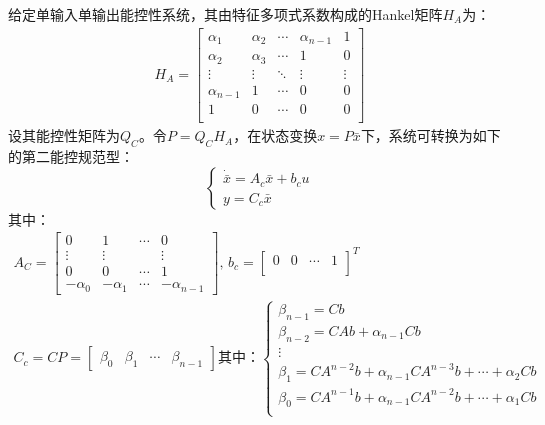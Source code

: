 \begin{theorem}[第二能控性规范型]
    给定单输入单输出能控性系统，其由特征多项式系数构成的Hankel矩阵$H_A$为：
    \begin{gather*}
        H_A = \begin{bmatrix}
            \alpha_1     & \alpha_2 & \cdots & \alpha_{n-1}  & 1       \\
            \alpha_2     & \alpha_3 & \cdots & 1             & 0       \\
            \vdots       & \vdots   & \ddots & \vdots        & \vdots  \\
            \alpha_{n-1} & 1        & \cdots & 0             & 0       \\
            1            & 0        & \cdots & 0             & 0       \\
        \end{bmatrix}
    \end{gather*}
    设其能控性矩阵为$Q_C$。令$P = Q_C H_A$，在状态变换$x = P \bar{x}$下，系统可转换为如下的第二能控规范型：
    \begin{equation*}
        \begin{cases}
            \dot{\bar{x}} = A_c \bar{x} + b_c u \\
            y = C_c \bar{x}
        \end{cases}
    \end{equation*}
    其中：
    \begin{gather*}
        A_C = \begin{bmatrix}
            0 & 1 & \cdots & 0 \\
            \vdots & \vdots &  & \vdots \\
            0 & 0 & \cdots & 1 \\
            -\alpha_0 & -\alpha_1 & \cdots & -\alpha_{n-1}
        \end{bmatrix} , \,
        b_c = \begin{bmatrix}
            0 & 0 & \cdots & 1 \\
        \end{bmatrix}^T  \\
        C_c = C P = \begin{bmatrix}
            \beta_0 & \beta_1 &  \cdots & \beta_{n-1}
        \end{bmatrix} \text{其中：}
        \begin{cases}
            \beta_{n-1} = C b \\
            \beta_{n-2} = C A b + \alpha_{n-1} C b \\
            \vdots \\
            \beta_1 = C A^{n-2} b + \alpha_{n-1} C A^{n-3} b + \cdots + \alpha_2 C b \\
            \beta_0 = C A^{n-1} b + \alpha_{n-1} C A^{n-2} b + \cdots + \alpha_1 C b \\
        \end{cases}
    \end{gather*}


\end{theorem}
